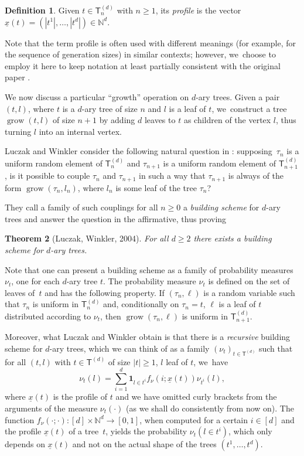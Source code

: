 \documentclass[11pt]{article}
\newcommand{\sT}{\mathsf{T}}
\newcommand{\grow}{\operatorname{grow}}
\newtheorem{thm}{Theorem}[section]
\theoremstyle{definition}
\newtheorem{defn}[thm]{Definition}
\begin{document}
\begin{defn}
Given $t\in \sT_n^{(d)}$ with $n\geq 1$, its \emph{profile} is the vector $\underline{x}(t)=(|t^1|,\ldots,|t^d|)\in \mathbb{N}^d$.	
\end{defn}

Note that the term profile is often used with different meanings (for example, for the sequence of generation sizes) in similar contexts; however, we~choose to employ it here to keep notation at least partially consistent with the original paper \cite{LW04}.

We now discuss a particular ``growth'' operation on $d$-ary trees. Given a pair $(t,l)$, where $t$ is a $d$-ary tree of size $n$ and $l$ is a leaf of $t$, we~construct a tree $\grow(t,l)$ of size $n+1$ by adding $d$ leaves to $t$ as children of the vertex $l$, thus turning $l$ into an internal vertex.

Luczak and Winkler consider the following natural question in \cite{LW04}: supposing~$\tau_n$ is a uniform random element of $\sT^{(d)}_n$ and $\tau_{n+1}$ is a uniform random element of $\sT^{(d)}_{n+1}$, is it possible to couple $\tau_n$ and $\tau_{n+1}$ in such a way that $\tau_{n+1}$ is always of the form $\grow(\tau_n,l_n)$, where $l_n$ is some leaf of the tree $\tau_n$?

They call a family of such couplings for all $n\geq 0$ a \emph{building scheme} for $d$-ary trees and answer the question in the affirmative, thus proving

\begin{thm}[Luczak, Winkler, 2004]\label{thm:building scheme existence}For all $d\geq 2$ there exists a building scheme for $d$-ary trees.
\end{thm}

Note that one can present a building scheme as a family of probability measures~$\nu_t$, one for each $d$-ary tree $t$. The probability measure $\nu_t$ is defined on the set of leaves of~$t$ and has the following property. If $(\tau_n,\ell)$ is a random variable such that $\tau_n$ is uniform in $\sT_n^{(d)}$ and, conditionally on $\tau_n=t$, $\ell$ is a leaf of $t$ distributed according to $\nu_t$, then $\grow(\tau_n, \ell)$ is uniform in $\sT^{(d)}_{n+1}$.

Moreover, what Luczak and Winkler obtain is that there is a \emph{recursive} building scheme for $d$-ary trees, which we can think of as a family $(\nu_t)_{t\in \sT^{(d)}}$ such that for all $(t,l)$ with $t\in \sT^{(d)}$ of size $|t|\geq 1$, $l$ leaf of $t$, we~have
\[
\nu_t(l)=\sum_{i=1}^d \mathbf{1}_{l\in t^i}f_\nu(i;\underline{x}(t))\nu_{t^i}(l),
\]
where $\underline{x}(t)$ is the profile of $t$ and we have omitted curly brackets from the arguments of the measure $\nu_t(\cdot)$ (as we shall do consistently from now on). The function $f_\nu(\cdot ;\cdot):[d]\times \mathbb{N}^d\to [0,1]$, when computed for a certain $i\in[d]$ and the profile $\underline{x}(t)$ of a tree~$t$, yields the probability $\nu_t(l\in t^i)$, which only depends on $\underline{x}(t)$ and not on the actual shape of the trees $(t^1,\ldots,t^d)$.
\end{document}
